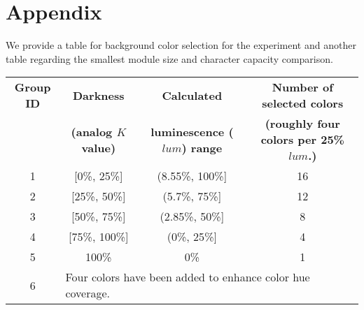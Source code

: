 \section{Appendix}\label{apedix: selection}
We provide a table for background color selection for the experiment and another table regarding the smallest module size and character capacity comparison.



\begin{table*}[h!]
\centering
\vspace{0.1cm}
\begin{tabular}{|c|c|c|c|}
\hline
\textbf{Group ID} & \textbf{Darkness}& \textbf{Calculated} & \textbf{Number of selected colors} \\
 & \textbf{{\small(analog $K$ value)}} & \textbf{luminescence ($lum$) range } & \textbf{{\small(roughly four colors per 25\% $lum$.)}} \\ \hline
1 & [0\%, 25\%] & (8.55\%, 100\%] & 16 \\ \hline
2 & [25\%, 50\%]& (5.7\%, 75\%] & 12 \\ \hline
3 & [50\%, 75\%] & (2.85\%, 50\%] & 8 \\ \hline
4 & [75\%, 100\%] & (0\%, 25\%] & 4 \\ \hline
5 & 100\% & 0\% & 1 \\ \hline
6 & \multicolumn{3}{|l|}{\small Four colors have been added to enhance color hue coverage.} \\ \hline
\end{tabular}
\vspace{0.1cm}
\caption[]{}\label{tab:color_coverage}
\vspace{-0.2cm}
\end{table*}\label{tab:studycolor}




